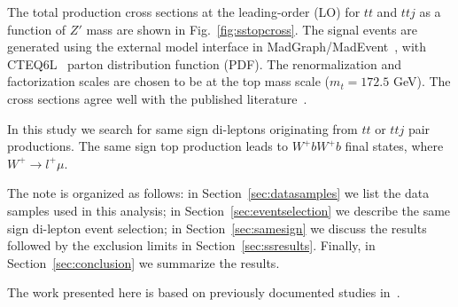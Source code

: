 The total production cross sections at the leading-order (LO) for $tt$ and $ttj$ as a function of $Z'$ 
mass are shown in Fig.~\ref{fig:sstopcross}. The signal events are generated using the external model interface in 
MadGraph/MadEvent~\cite{madgraph}, with CTEQ6L~\cite{cteq6l} parton distribution function (PDF). The renormalization and factorization
scales are chosen to be at the top mass scale ($m_{t} = 172.5$ GeV). The cross sections agree well with the published
literature~\cite{berger}. 

In this study we search for same sign di-leptons originating from $tt$ or $ttj$ pair productions. The same sign top
production leads to $W^+ b W^+ b$ final states, where $W^+ \rightarrow l^+ \mu$. 

The note is organized as follows: in Section~\ref{sec:datasamples} we list the data samples used in this analysis; 
in Section~\ref{sec:eventselection} we describe the same sign di-lepton event selection; in Section~\ref{sec:samesign} 
we discuss the results followed by the exclusion limits in Section~\ref{sec:ssresults}. Finally, in Section~\ref{sec:conclusion} 
we summarize the results.  

The work presented here is based on previously documented studies in~\cite{ssnote1, sspaper}.

 



